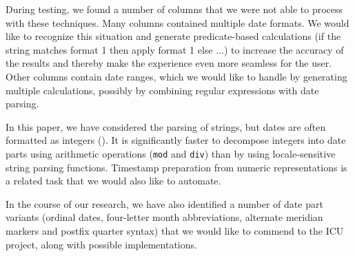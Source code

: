 During testing, we found a number of columns that we were not able to process with these techniques. Many columns contained multiple date formats. We would like to recognize this situation and generate predicate-based calculations (\eg if the string matches format 1 then apply format 1 else ...) to increase the accuracy of the results and thereby make the experience even more seamless for the user. Other columns contain date ranges, which we would like to handle by generating multiple calculations, possibly by combining regular expressions with date parsing.

In this paper, we have considered the parsing of strings, but dates are often formatted as integers (\eg {}). 
It is significantly faster to decompose integers into date parts using arithmetic operations (\eg \texttt{mod} and \texttt{div}) than by using locale-sensitive string parsing functions. 
Timestamp preparation from numeric representations is a related task that we would also like to automate.

In the course of our research, we have also identified a number of date part variants (\eg ordinal dates, four-letter month abbreviations, alternate meridian markers and postfix quarter syntax) that we would like to commend to the ICU project, along with possible implementations.
